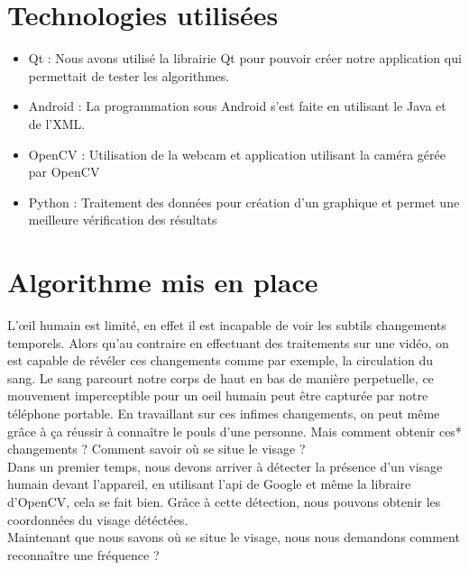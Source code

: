\section{Technologies utilisées}

\begin{itemize}[label=\textbullet]
	\item Qt : Nous avons utilisé la librairie Qt pour pouvoir créer notre application qui permettait de tester les algorithmes.
	\item Android : La programmation sous Android s'est faite en utilisant le Java et de l'XML.
	\item OpenCV : Utilisation de la webcam et application utilisant la caméra gérée par OpenCV
	\item Python : Traitement des données pour création d'un graphique et permet une meilleure vérification des résultats
\end{itemize}

\section{Algorithme mis en place}

L’\oe il humain est limité, en effet il est incapable de voir les subtils changements temporels. Alors qu'au contraire en effectuant des traitements sur une vidéo, on est capable de
 révéler ces changements comme par exemple, la circulation du sang. Le sang parcourt notre corps de haut en bas de manière perpetuelle, ce mouvement imperceptible pour un oeil humain peut
 être capturée par notre téléphone portable. En travaillant sur ces infimes changements, on peut même grâce à ça réussir à connaître le pouls d'une personne. Mais comment obtenir ces*
  changements ? Comment savoir où se situe le visage ?\\

Dans un premier temps, nous devons arriver à détecter la présence d'un visage humain devant l'appareil, en utilisant l'api de Google et même la libraire d'OpenCV, cela se fait bien.
Grâce à cette détection, nous pouvons obtenir les coordonnées du visage détéctées.\\

Maintenant que nous savons où se situe le visage, nous nous demandons comment reconnaître une fréquence ?\\

